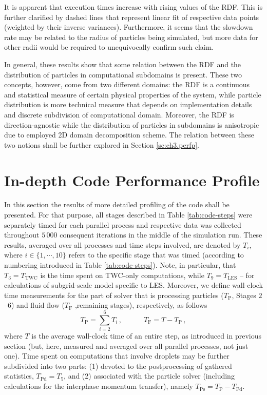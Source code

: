 \documentclass{pracamgren}
\begin{document}
It is apparent that execution times increase with rising values of the RDF. 
This is further clarified by dashed lines that represent linear fit of respective data points (weighted by their inverse variances). 
Furthermore, it seems that the slowdown rate may be related to the radius of particles being simulated, but more data for other radii would be required to unequivocally confirm such claim.

In general, these results show that some relation between the RDF and the distribution of particles in computational subdomains is present.
These two concepts, however, come from two different domains: the RDF is a continuous and statistical measure of certain physical properties of the system, while particle distribution is more technical measure that depends on implementation details and discrete subdivision of computational domain.
Moreover, the RDF is direction-agnostic while the distribution of particles in subdomains is anisotropic due to employed 2D domain decomposition scheme.
The relation between these two notions shall be further explored in Section \ref{sc:ch3.perfp}.



\section{In-depth Code Performance Profile}
\label{sc:ch3.pprof}

In this section the results of more detailed profiling of the code shall be presented.
For that purpose, all stages described in Table \ref{tab:code-steps} were separately timed for each parallel process and respective data was collected throughout $5\,000$ consequent iterations in the middle of the simulation run.
These results, averaged over all processes and time steps involved, are denoted by  $T_i$, where $i \in \{ 1, \cdots, 10 \}$ refers to the specific stage that was timed (according to numbering introduced in Table \ref{tab:code-steps}).
Note, in particular, that $T_3 = T_{\text{TWC}}$ is the time spent on TWC-only computations, while $T_9 = T_{\text{LES}}$ -- for calculations of subgrid-scale model specific to LES.
Moreover, we define wall-clock time measurements for the part of solver that is processing particles ($T_{\text{P}}$, Stages $2$--$6$) and fluid flow ($T_{\text{F}}$ ,remaining stages), respectively, as follows
\begin{equation}
T_{\text{P}} = \sum_{i=2}^{6} T_i \, , \quad \quad \quad T_{\text{F}} = T - T_{\text{P}} \, ,
\label{eqn:pff-tp-tf}
\end{equation}
where $T$ is the average wall-clock time of an entire step, as introduced in previous section (but, here, measured and averaged over all parallel processes, not just one).
Time spent on computations that involve droplets may be further subdivided into two parts: (1) devoted to the postprocessing of gathered statistics, $T_{\text{Pd}} = T_5$, and (2) associated with the particle solver (including calculations for the interphase momentum transfer), namely $T_{\text{Ps}} = T_{\text{P}} - T_{\text{Pd}}$.
\end{document}

